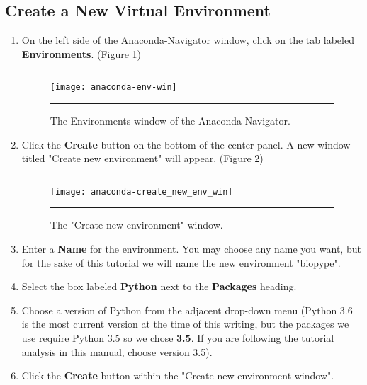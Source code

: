 \subsection*{Create a New Virtual Environment}
    
    \begin{enumerate}
        \item {} On the left side of the Anaconda-Navigator window, click on the tab labeled \textbf{Environments}. (Figure \ref{anaconda-env-win}) 
        
\begin{figure}[hbtp]
    \begin{maxipage}
    \hrule
    \centering
    \texttt{[image: anaconda-env-win]}
    \caption{The Environments window of the Anaconda-Navigator.}
    \label{anaconda-env-win}
    \hrule
    \end{maxipage}
\end{figure}
        \item Click the \textbf{Create} button on the bottom of the center panel. A new window titled "Create new environment" will appear. (Figure \ref{anaconda-create-new-env-win})

\begin{figure}[hbtp]
    \begin{maxipage}
    \hrule
    \centering
    \texttt{[image: anaconda-create\_new\_env\_win]}
    \caption{The "Create new environment" window.}
    \label{anaconda-create-new-env-win}
    \hrule
    \end{maxipage}
\end{figure}
        
        \item Enter a \textbf{Name} for the environment. You may choose any name you want, but for the sake of this tutorial we will name the new environment "biopype".
        \item Select the box labeled \textbf{Python} next to the \textbf{Packages} heading.
        \item Choose a version of Python from the adjacent drop-down menu (Python 3.6 is the most current version at the time of this writing, but the packages we use require Python 3.5 so we chose \textbf{3.5}. If you are following the tutorial analysis in this manual, choose version 3.5).
        \item Click the \textbf{Create} button within the "Create new environment window".
    \end{enumerate}

